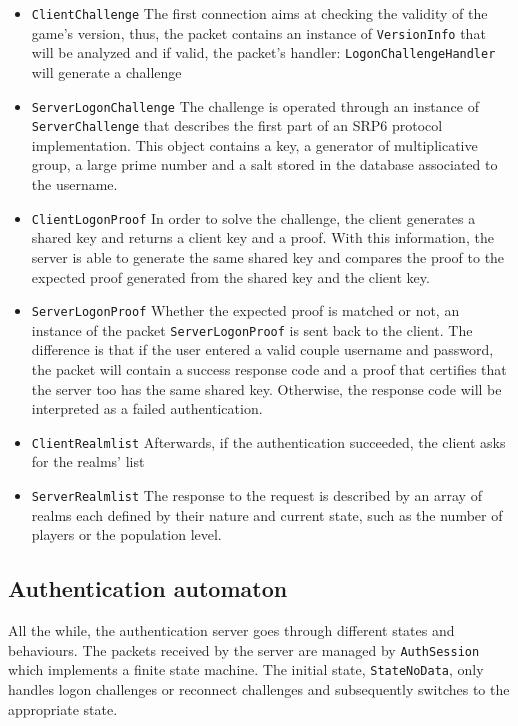 \documentclass[paper=a4, fontsize=11pt]{scrartcl}
\begin{document}
\begin{itemize}
    \item \texttt{ClientChallenge}
        The first connection aims at checking the validity of the game's version, 
        thus, the packet contains an instance of \texttt{VersionInfo} that will 
        be analyzed and if valid, the packet's handler: 
        \texttt{LogonChallengeHandler} will generate a challenge

    \item \texttt{ServerLogonChallenge}
        The challenge is operated through an instance of \texttt{ServerChallenge} that describes
        the first part of an SRP6 protocol implementation. This object contains a 
        key, a generator of multiplicative group, a large prime number and a salt 
        stored in the database associated to the username.

    \item \texttt{ClientLogonProof}
        In order to solve the challenge, the client generates a shared key and returns
        a client key and a proof. With this information, the server is able to generate the
        same shared key and compares the proof to the expected proof generated from the
        shared key and the client key. 

    \item \texttt{ServerLogonProof}
        Whether the expected proof is matched or not, an instance of the packet 
        \texttt{ServerLogonProof} is sent back to the client. The difference 
        is that if the user entered a valid couple username and password, the packet 
        will contain a success response code and a proof that certifies that the 
        server too has the same shared key. Otherwise, the response code will be 
        interpreted as a failed authentication.

    \item \texttt{ClientRealmlist}
Afterwards, if the authentication succeeded, the client asks for the realms' list

    \item \texttt{ServerRealmlist}
        The response to the request is described by an array of realms each defined
        by their nature and current state, such as the number of players or the population
        level.
\end{itemize}

\subsection{Authentication automaton}
All the while, the authentication server goes through different states and
behaviours. The packets received by the server are managed by \texttt{AuthSession} which 
implements a finite state machine. The initial state, \texttt{StateNoData}, only handles
logon challenges or reconnect challenges and subsequently switches to the
appropriate state. \\
\end{document}
